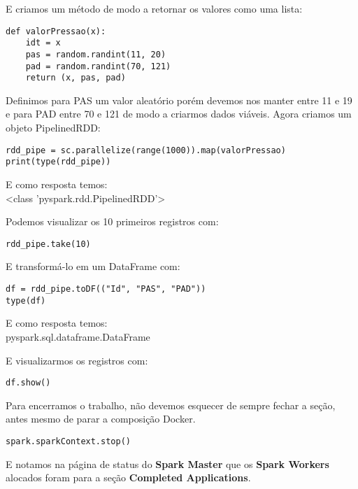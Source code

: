 E criamos um método de modo a retornar os valores como uma lista:
\begin{lstlisting}[]
def valorPressao(x):
    idt = x
    pas = random.randint(11, 20)
    pad = random.randint(70, 121)
    return (x, pas, pad)
\end{lstlisting}

Definimos para PAS um valor aleatório porém devemos nos manter entre 11 e 19 e para PAD entre 70 e 121 de modo a criarmos dados viáveis. Agora criamos um objeto PipelinedRDD:
\begin{lstlisting}[]
rdd_pipe = sc.parallelize(range(1000)).map(valorPressao)
print(type(rdd_pipe))
\end{lstlisting}

E como resposta temos: \\
{\ttfamily <class 'pyspark.rdd.PipelinedRDD'>}

Podemos visualizar os 10 primeiros registros com:
\begin{lstlisting}[]
rdd_pipe.take(10)
\end{lstlisting}

E transformá-lo em um DataFrame com:
\begin{lstlisting}[]
df = rdd_pipe.toDF(("Id", "PAS", "PAD"))
type(df)
\end{lstlisting}

E como resposta temos: \\
{\ttfamily pyspark.sql.dataframe.DataFrame}

E visualizarmos os registros com:
\begin{lstlisting}[]
df.show()
\end{lstlisting}

Para encerramos o trabalho, não devemos esquecer de sempre fechar a seção, antes mesmo de parar a composição Docker.
\begin{lstlisting}[]
spark.sparkContext.stop()
\end{lstlisting}

E notamos na página de status do \textbf{Spark Master} que os \textbf{Spark Workers} alocados foram para a seção \textbf{Completed Applications}.
\clearpage